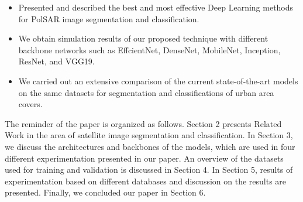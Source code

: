 \documentclass[a4paper,12pt]{spieman}  %
\begin{document}
\begin{spacing}{1}
\begin{itemize}
    \item Presented and described the best and most effective Deep Learning methods for PolSAR image segmentation and classification.
    \item We obtain simulation results of our proposed technique with different backbone networks such as EffcientNet, DenseNet, MobileNet, Inception, ResNet, and VGG19.
    \item We carried out an extensive comparison of the current state-of-the-art models on the same datasets for segmentation and classifications of urban area covers.
\end{itemize}
The reminder of the paper is organized as follows. Section 2 presents Related Work in the area of satellite image segmentation and classification. In Section 3, we discuss the architectures and backbones of the models, which are used in four different experimentation presented in our paper. An overview of the datasets used for training and validation is discussed in Section 4. In Section 5, results of experimentation based on different databases and discussion on the results are presented. Finally, we concluded our paper in Section 6.

\end{spacing}
\end{document}
